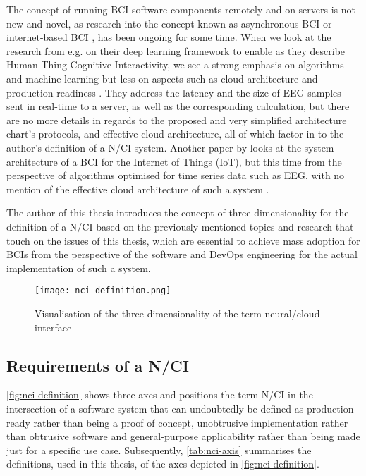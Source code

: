 The concept of running BCI software components remotely and on servers is not new and novel, as research into the concept known as asynchronous BCI \citep{an_design_2016} or internet-based BCI \citep{lampe_brain-computer_2014}, has been ongoing for some time. When we look at the research from e.g. \citeauthor{zhang_internet_2018} on their deep learning framework to enable as they describe Human-Thing Cognitive Interactivity, we see a strong emphasis on algorithms and machine learning but less on aspects such as cloud architecture and production-readiness \citep{zhang_internet_2018}. They address the latency and the size of EEG samples sent in real-time to a server, as well as the corresponding calculation, but there are no more details in regards to the proposed and very simplified architecture chart's protocols, and effective cloud architecture, all of which factor in to the author's definition of a N/CI system. Another paper by \citeauthor{ahamad_system_2022} looks at the system architecture of a BCI for the Internet of Things (IoT), but this time from the perspective of algorithms optimised for time series data such as EEG, with no mention of the effective cloud architecture of such a system \citep{ahamad_system_2022}.

The author of this thesis introduces the concept of three-dimensionality for the definition of a N/CI based on the previously mentioned topics and research that touch on the issues of this thesis, which are essential to achieve mass adoption for BCIs from the perspective of the software and DevOps engineering for the actual implementation of such a system.

\begin{figure}[!ht]
  \centering
  \texttt{[image: nci-definition.png]}
  \caption{Visualisation of the three-dimensionality of the term neural/cloud interface}
  \label{fig:nci-definition}
\end{figure}

\subsection{Requirements of a N/CI}
\label{chapter2-requirements-of-a-nci}

\autoref{fig:nci-definition} shows three axes and positions the term N/CI in the intersection of a software system that can undoubtedly be defined as production-ready rather than being a proof of concept, unobtrusive implementation rather than obtrusive software and general-purpose applicability rather than being made just for a specific use case. Subsequently, \autoref{tab:nci-axis} summarises the definitions, used in this thesis, of the axes depicted in \autoref{fig:nci-definition}.

